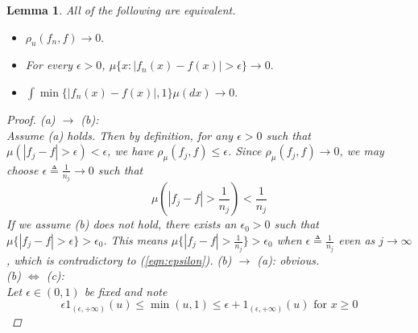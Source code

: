 \documentclass[12pt]{amsart}
\theoremstyle{plain}
\newtheorem{lemma}[thm]{Lemma}
\theoremstyle{definition}
\theoremstyle{remark}
\numberwithin{equation}{section}
\numberwithin{thm}{section}
\begin{document}
\begin{lemma}\label{HornikLemma2.1}
    All of the following are equivalent.
    \begin{itemize}
        \item [(a)] $\rho_u(f_n,f) \to 0.$\\
        \item [(b)] For every $\epsilon >0$, $\mu\{x: |f_n(x)-f(x)| > \epsilon \} \to 0.$\\
        \item[(c)] $\int \min \{ |f_n(x)-f(x)|, 1 \} \mu(dx) \to 0.$
    \end{itemize}
\begin{proof} 

(a) $\to$ (b): \\
Assume (a) holds. 
Then by definition, for any $\epsilon > 0$ such that $\mu(|f_j-f|> \epsilon) < \epsilon$, we have $\rho_\mu (f_j,f) \leq \epsilon$. 
Since $\rho_\mu (f_j,f) \to 0$, we may choose $\epsilon \triangleq \frac{1}{n_j} \to 0$ such that 
\begin{equation}\label{eqn:epsilon}
\mu(|f_j-f| > \frac{1}{n_j}) < \frac{1}{n_j}
\end{equation}
If we assume (b) does not hold, there exists an $\epsilon_0 > 0$ such that $\mu\{ |f_j-f| > \epsilon \} > \epsilon_0$. This means $\mu\{ |f_j-f| > \frac{1}{n_j} \} > \epsilon_0$ when $\epsilon \triangleq \frac{1}{n_j}$ even as $j \to \infty$, which is contradictory to (\ref{eqn:epsilon}).
(b) $\to$ (a): obvious.\\
(b) $\iff$ (c): \\
Let $\epsilon \in (0,1)$ be fixed and note 
\begin{equation} \label{eqn:epsil}
\epsilon 1_{(\epsilon,+\infty)}(u) \leq \min(u,1) \leq \epsilon + 1_{(\epsilon,+\infty)}(u) \text{ for } x \geq 0 
\end{equation}


\end{proof}
\end{lemma}
\end{document}

